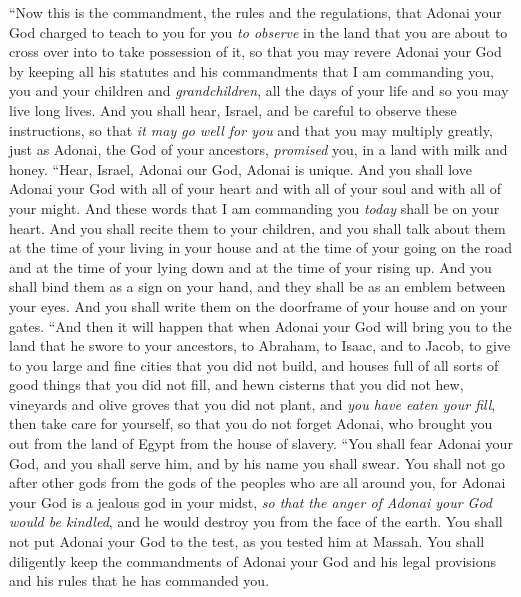 \begin{biblechapter} %
 “Now this is the commandment, the rules and the regulations, that Adonai your God charged to teach to you for you \textit{to observe} in the land that you are about to cross over into to take possession of it,
\verse so that you may revere Adonai your God by keeping all his statutes and his commandments that I am commanding you, you and your children and \textit{grandchildren}, all the days of your life and so you may live long lives.
\verse And you shall hear, Israel, and be careful to observe these instructions, so that \textit{it may go well for you} and that you may multiply greatly, just as Adonai, the God of your ancestors, \textit{promised} you, in a land with milk and honey.
\verse “Hear, Israel, Adonai our God, Adonai is unique.
\verse And you shall love Adonai your God with all of your heart and with all of your soul and with all of your might.
\verse And these words that I am commanding you \textit{today} shall be on your heart.
\verse And you shall recite them to your children, and you shall talk about them at the time of your living in your house and at the time of your going on the road and at the time of your lying down and at the time of your rising up.
\verse And you shall bind them as a sign on your hand, and they shall be as an emblem between your eyes.
\verse And you shall write them on the doorframe of your house and on your gates.
\verse “And then it will happen that when Adonai your God will bring you to the land that he swore to your ancestors, to Abraham, to Isaac, and to Jacob, to give to you large and fine cities that you did not build,
\verse and houses full of all sorts of good things that you did not fill, and hewn cisterns that you did not hew, vineyards and olive groves that you did not plant, and \textit{you have eaten your fill},
\verse then take care for yourself, so that you do not forget Adonai, who brought you out from the land of Egypt from the house of slavery.
\verse “You shall fear Adonai your God, and you shall serve him, and by his name you shall swear.
\verse You shall not go after other gods from the gods of the peoples who are all around you,
\verse for Adonai your God is a jealous god in your midst, \textit{so that the anger of Adonai your God would be kindled}, and he would destroy you from the face of the earth.
\verse You shall not put Adonai your God to the test, as you tested him at Massah.
\verse You shall diligently keep the commandments of Adonai your God and his legal provisions and his rules that he has commanded you.

\end{biblechapter}
